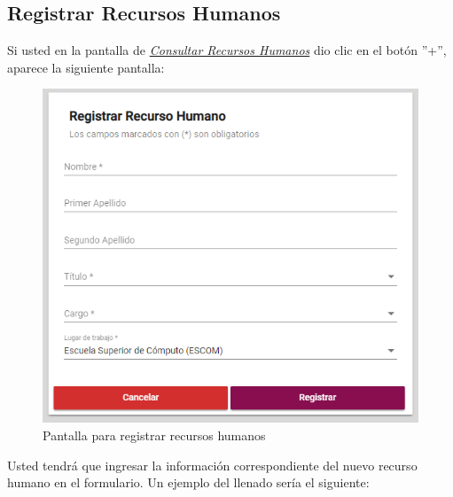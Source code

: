 


    \newpage
        \hypertarget{registrarRH}{}
        \subsection{Registrar Recursos Humanos}
            Si usted  en la pantalla de \hyperlink{consultarRH}{\textit{Consultar Recursos Humanos}} dio clic en el botón ''+'', aparece la siguiente pantalla:

            \begin{figure}[H]
                \centering
                \hypertarget{registrarUs}{\includegraphics[width=0.7\linewidth]{images/SP1/RegistrarRH}}
                \caption{Pantalla para registrar recursos humanos}
                \label{registrarrh}
            \end{figure}

            Usted tendrá que ingresar la información correspondiente del nuevo recurso humano en el formulario. Un ejemplo del llenado sería el siguiente:

